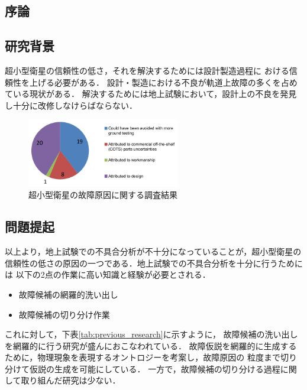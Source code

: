 \documentclass[11pt]{jsarticle}%
\begin{document}
\begin{multicols}{2}
  \section{序論}
  \vspace{-1zh}
  \subsection{研究背景}
  \vspace{-1zh}
  超小型衛星の信頼性の低さ，それを解決するためには設計製造過程に
  おける信頼性を上げる必要がある．
  設計・製造における不良が軌道上故障の多くを占めている現状がある．
  解決するためには地上試験において，設計上の不良を発見し十分に改修しなけらばならない．

  \begin{figure}[H]
    \centering
      \includegraphics[height=3.0cm]{../figure/cause_of_failure.png}
      \caption{超小型衛星の故障原因に関する調査結果\cite{Venturini2017}}
      \label{fig:cause_of_failure}
  \end{figure}
  
  \subsection{問題提起}
  \vspace{-1zh}
  以上より，地上試験での不具合分析が不十分になっていることが，超小型衛星の
  信頼性の低さの原因の一つである．地上試験での不具合分析を十分に行うためには
  以下の2点の作業に高い知識と経験が必要とされる．
  \begin{itemize}
    \item 故障候補の網羅的洗い出し
    \item 故障候補の切り分け作業
  \end{itemize}
これに対して，下表\ref{tab:previous_research}に示すように，
故障候補の洗い出しを網羅的に行う研究が盛んにおこなわれている．
故障仮説を網羅的に生成するために，物理現象を表現するオントロジーを考案し，故障原因の
粒度まで切り分けて仮説の生成を可能にしている．
一方で，故障候補の切り分ける過程に関して取り組んだ研究は少ない．


\end{multicols}
\end{document}
